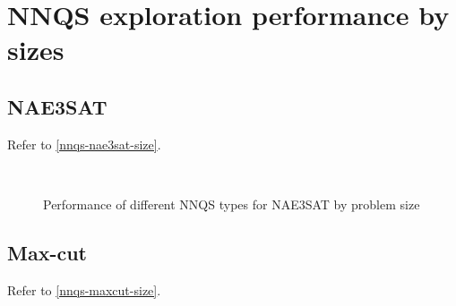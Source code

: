 \chapter{NNQS exploration performance by sizes}\label{appendix:nnqssizegraph}

\section{NAE3SAT}
Refer to \autoref{nnqs-nae3sat-size}.

\begin{figure}[!htbp]
    \centering
    \\
    \caption{Performance of different NNQS types for NAE3SAT by problem size}
    \label{nnqs-nae3sat-size}
\end{figure}

\section{Max-cut}
Refer to \autoref{nnqs-maxcut-size}.

